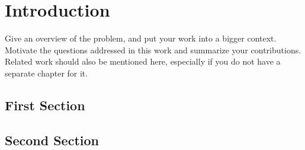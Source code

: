 
\chapter{Introduction}
Give an overview of the problem, and put your work into a bigger
context. Motivate the questions addressed in this work and summarize
your contributions. Related work should also be mentioned here,
especially if you do not have a separate chapter for it.

\section{First Section}


\section{Second Section}


